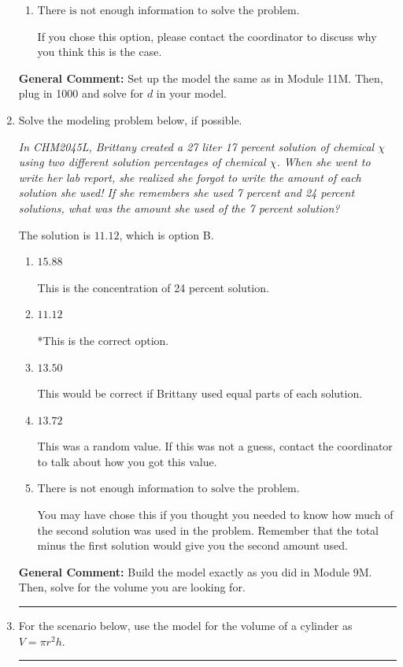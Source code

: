 \documentclass{extbook}[14pt]
\newcommand{\litem}[1]{\item #1

\rule{\textwidth}{0.4pt}}
\begin{document}
\begin{enumerate}
{\begin{enumerate}[label=\Alph*.]
You modeled the situation with $e$ as the base and did not apply the properties of log correctly.
\item \( \text{There is not enough information to solve the problem.} \)

If you chose this option, please contact the coordinator to discuss why you think this is the case.
\end{enumerate}

\textbf{General Comment:} Set up the model the same as in Module 11M. Then, plug in 1000 and solve for $d$ in your model.
}
\litem{
Solve the modeling problem below, if possible.

\begin{center}
    \textit{ In CHM2045L, Brittany created a 27 liter 17 percent solution of chemical $\chi$ using two different solution percentages of chemical $\chi$. When she went to write her lab report, she realized she forgot to write the amount of each solution she used! If she remembers she used 7 percent and 24 percent solutions, what was the amount she used of the 7 percent solution? }
\end{center}


The solution is \( 11.12 \), which is option B.\begin{enumerate}[label=\Alph*.]
\item \( 15.88 \)

This is the concentration of 24 percent solution.
\item \( 11.12 \)

*This is the correct option.
\item \( 13.50 \)

This would be correct if Brittany used equal parts of each solution.
\item \( 13.72 \)

This was a random value. If this was not a guess, contact the coordinator to talk about how you got this value.
\item \( \text{There is not enough information to solve the problem.} \)

You may have chose this if you thought you needed to know how much of the second solution was used in the problem. Remember that the total minus the first solution would give you the second amount used.
\end{enumerate}

\textbf{General Comment:} Build the model exactly as you did in Module 9M. Then, solve for the volume you are looking for.
}
\litem{
For the scenario below, use the model for the volume of a cylinder as $V = \pi r^2 h$.

}
\end{enumerate}
\end{document}
